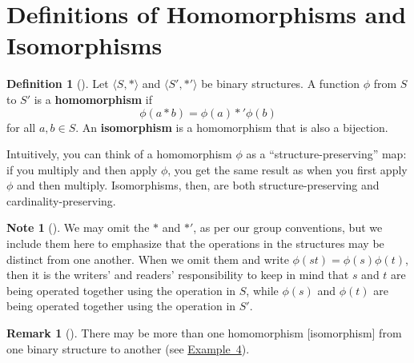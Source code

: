 \documentclass[10pt,openany,oneside]{book}
\newcommand{\terminology}[1]{\textbf{#1}}
\theoremstyle{plain}
\theoremstyle{definition}
\newtheorem{definition}[theorem]{Definition}
\theoremstyle{definition}
\newtheorem{remark}[theorem]{Remark}
\newtheorem{note}[theorem]{Note}
\theoremstyle{definition}
\theoremstyle{definition}
\numberwithin{equation}{section}
\begin{document}
\section[{Definitions of Homomorphisms and Isomorphisms}]{Definitions of Homomorphisms and Isomorphisms}\label{section-11}
\begin{definition}[{}]\label{definition-31}
Let \(\langle S,*\rangle\) and \(\langle S',*'\rangle\) be binary structures. A function \(\phi\) from \(S\) to \(S'\) is a \terminology{homomorphism} if%
\begin{equation*}
\phi(a* b)=\phi(a)*'\phi(b)
\end{equation*}
for all \(a,b\in S\). An \terminology{isomorphism} is a homomorphism that is also a bijection.%
\end{definition}
Intuitively, you can think of a homomorphism \(\phi\) as a ``structure-preserving'' map: if you multiply and then apply \(\phi\), you get the same result as when you first apply \(\phi\) and then multiply. Isomorphisms, then, are both structure-preserving and cardinality-preserving.%
\begin{note}[]\label{note-6}
We may omit the \(*\) and \(*'\), as per our group conventions, but we include them here to emphasize that the operations in the structures may be distinct from one another. When we omit them and write \(\phi(st)=\phi(s)\phi(t)\), then it is the writers' and readers' responsibility to keep in mind that \(s\) and \(t\) are being operated together using the operation in \(S\), while \(\phi(s)\) and \(\phi(t)\) are being operated together using the operation in \(S'\).%
\end{note}
\begin{remark}[]\label{remark-17}
There may be more than one homomorphism [isomorphism] from one binary structure to another (see \hyperref[homos]{Example~4}).%
\end{remark}
\end{document}
